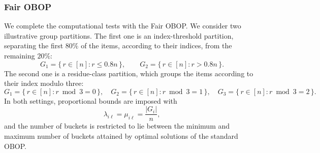 \documentclass[pdflatex,basic,Numbered]{jnl}%
\theoremstyle{plain}
\theoremstyle{remark}
\theoremstyle{thmstyleone}%
\theoremstyle{thmstylethree}%
\begin{document}
\subsubsection{{Fair \rm OBOP}}

We complete the computational tests with the Fair {\rm OBOP}. We consider two illustrative group partitions. The first one is an index-threshold partition, separating the first \(80\%\) of the items, according to their indices, from the remaining \(20\%\):
\[
G_1=\{\,r\in[n]: r\le 0.8n\,\},
\qquad
G_2=\{\,r\in[n]: r>0.8n\,\}.
\]
The second one is a residue-class partition, which groups the items according to their index modulo three:
\[
G_1=\{\,r\in[n]: r\bmod 3=0\,\},\quad
G_2=\{\,r\in[n]: r\bmod 3=1\,\},\quad
G_3=\{\,r\in[n]: r\bmod 3=2\,\}.
\]
In both settings, proportional bounds are imposed with
\[
\lambda_{i\ell}=\mu_{i\ell}=\frac{|G_i|}{n},
\]
and the number of buckets is restricted to lie between the minimum and maximum number of buckets attained by optimal solutions of the standard {\rm OBOP}.
\end{document}
